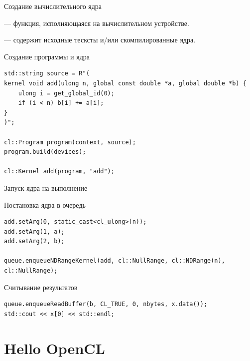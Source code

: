 \documentclass[@BEAMER_OPTIONS@]{beamer}
\begin{document}
\begin{frame}[fragile]{Создание вычислительного ядра}
    \begin{description}[\;\;]
        \item[Ядро] --- функция, исполняющаяся на вычислительном устройстве.
        \item[Программа] --- содержит исходные тесксты и/или скомпилированные
            ядра.
    \end{description}
    \begin{exampleblock}{Создание программы и ядра}
        \begin{lstlisting}
std::string source = R"(
kernel void add(ulong n, global const double *a, global double *b) {
    ulong i = get_global_id(0);
    if (i < n) b[i] += a[i];
}
)";

cl::Program program(context, source);
program.build(devices);

cl::Kernel add(program, "add");
        \end{lstlisting}
    \end{exampleblock}
\end{frame}

\begin{frame}[fragile]{Запуск ядра на выполнение}
    \begin{exampleblock}{Постановка ядра в очередь}
        \begin{lstlisting}
add.setArg(0, static_cast<cl_ulong>(n));
add.setArg(1, a);
add.setArg(2, b);

queue.enqueueNDRangeKernel(add, cl::NullRange, cl::NDRange(n), cl::NullRange);
        \end{lstlisting}
    \end{exampleblock}

    \begin{exampleblock}{Считывание результатов}
        \begin{lstlisting}
queue.enqueueReadBuffer(b, CL_TRUE, 0, nbytes, x.data());
std::cout << x[0] << std::endl;
        \end{lstlisting}
    \end{exampleblock}
\end{frame}

\section{Hello OpenCL}
\end{document}
